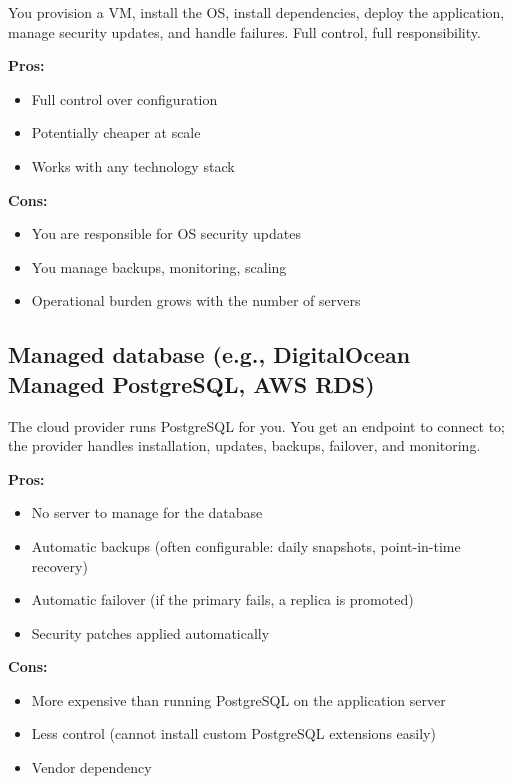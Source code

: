 You provision a VM, install the OS, install dependencies, deploy the application, manage security updates, and handle failures. Full control, full responsibility.

\textbf{Pros:}

\begin{itemize}
\tightlist
\item
  Full control over configuration
\item
  Potentially cheaper at scale
\item
  Works with any technology stack
\end{itemize}

\noindent{}\textbf{Cons:}

\begin{itemize}
\tightlist
\item
  You are responsible for OS security updates
\item
  You manage backups, monitoring, scaling
\item
  Operational burden grows with the number of servers
\end{itemize}

\subsection*{Managed database (e.g., DigitalOcean Managed PostgreSQL, AWS RDS)}\label{20-server-fundamentals:managed-database-eg-digitalocean-managed-postgresql-aws-rds}

The cloud provider runs PostgreSQL for you. You get an endpoint to connect to; the provider handles installation, updates, backups, failover, and monitoring.

\textbf{Pros:}

\begin{itemize}
\tightlist
\item
  No server to manage for the database
\item
  Automatic backups (often configurable: daily snapshots, point-in-time recovery)
\item
  Automatic failover (if the primary fails, a replica is promoted)
\item
  Security patches applied automatically
\end{itemize}

\noindent{}\textbf{Cons:}

\begin{itemize}
\tightlist
\item
  More expensive than running PostgreSQL on the application server
\item
  Less control (cannot install custom PostgreSQL extensions easily)
\item
  Vendor dependency
\end{itemize}


